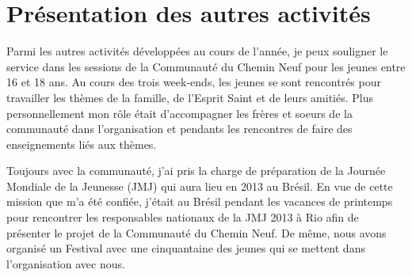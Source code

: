 \section{Présentation des autres activités}
Parmi les autres activités développées au cours de l'année, je peux souligner le service dans les sessions de la Communauté du Chemin Neuf pour les jeunes entre 16 et 18 ans. Au cours des trois week-ends, les jeunes se sont rencontrés pour travailler les thèmes de la famille, de l'Esprit Saint et de leurs amitiés. Plus personnellement mon rôle était d’accompagner les frères et soeurs de la communauté dans l’organisation et pendants les rencontres de faire des enseignements liés aux thèmes. 

 Toujours avec la communauté, j'ai pris la charge de préparation de la Journée Mondiale de la Jeunesse (JMJ) qui aura lieu en 2013 au Brésil. En vue de cette mission que m’a été confiée, j’était au Brésil pendant les vacances de printemps pour rencontrer les responsables nationaux de la JMJ 2013 à Rio afin de présenter le projet de la Communauté du Chemin Neuf. De même, nous avons organisé un Festival avec une cinquantaine des jeunes qui se mettent dans l’organisation avec nous.
 
 
